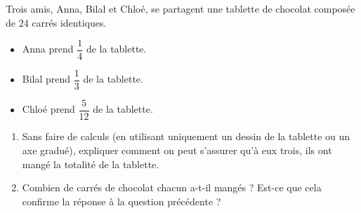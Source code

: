 \documentclass[a4paper]{book}
\begin{document}
    \begin{exercice}
        Trois amis, Anna, Bilal et Chloé, se partagent une tablette de chocolat composée de $24$ carrés identiques.
        \begin{itemize}
            \item Anna prend $\dfrac{1}{4}$ de la tablette.
            \item Bilal prend $\dfrac{1}{3}$ de la tablette.
            \item Chloé prend $\dfrac{5}{12}$ de la tablette.
        \end{itemize}
        
        \begin{enumerate}
            \item Sans faire de calculs (en utilisant uniquement un dessin de la tablette ou un axe gradué), expliquer comment on peut s'assurer qu'à eux trois, ils ont mangé la totalité de la tablette.
            \item Combien de carrés de chocolat chacun a-t-il mangés ? Est-ce que cela confirme la réponse à la question précédente ?
        \end{enumerate}
    \end{exercice}
\end{document}
